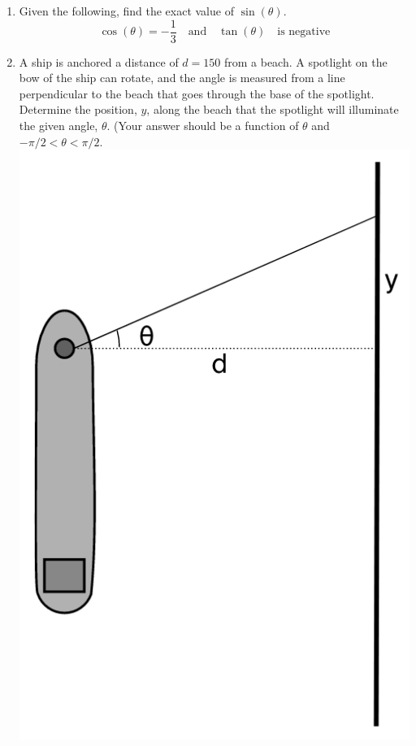 \documentclass[11pt]{article}
\begin{document}
\begin{enumerate}
\begin{enumerate}
\end{enumerate}


\newpage



\item Given the following, find the exact value of $\sin{(\theta)}.$\\
$$\cos{(\theta)}=-\frac{1}{3} \quad \text{and}\quad \tan{(\theta)} \quad \text{is negative}$$\vfill


\item A ship is anchored a distance of $d=150$ from a beach.  A spotlight on the bow of the ship can rotate, and the angle is measured from a line perpendicular to the beach that goes through the base of the spotlight.  Determine the position, $y$, along the beach that the spotlight will illuminate the given angle, $\theta$.  (Your answer should be a function of $\theta$ and $-\pi/2<\theta <\pi/2.$\\
\includegraphics[scale=.4]{ship1}\\


\end{enumerate}
\end{document}
